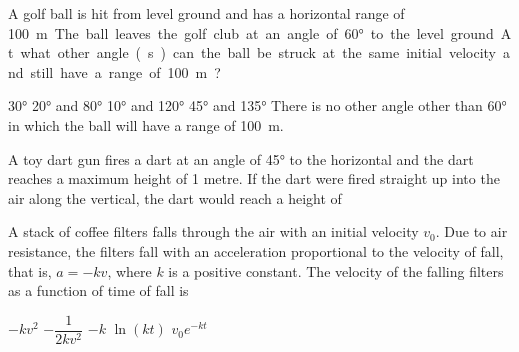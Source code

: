 \documentclass{../../../oss-apphys-exam}
\begin{document}




\begin{questions}
  \question A golf ball is hit from level ground and has a horizontal range of
  \SI{100}\metre. The ball leaves the golf club at an angle of \ang{60} to the
  level ground. At what other angle(s) can the ball be struck at the same
  initial velocity and still have a range of \SI{100}\metre?
  \begin{center}
  \end{center}
  \begin{choices}
    \choice\ang{30}
    \choice\ang{20} and \ang{80}
    \choice\ang{10} and \ang{120}
    \choice\ang{45} and \ang{135}
    \choice There is no other angle other than \ang{60} in which the ball will
    have a range of \SI{100}\metre.
  \end{choices}

  \question A toy dart gun fires a dart at an angle of \ang{45} to the
  horizontal and the dart reaches a maximum height of 1 metre. If the dart were
  fired straight up into the air along the vertical, the dart would reach a
  height of
  
  \question A stack of coffee filters falls through the air with an initial
  velocity $v_0$. Due to air resistance, the filters fall with an acceleration
  proportional to the velocity of fall, that is, $a=-kv$, where $k$ is a
  positive constant. The velocity of the falling filters as a function of time
  of fall is
  \begin{choices}
    \choice $-kv^2$
    \choice $-\dfrac1{2kv^2}$
    \choice $-k$
    \choice $\ln(kt)$
    \choice $v_0e^{-kt}$
  \end{choices}
    

\end{questions}
\end{document}
